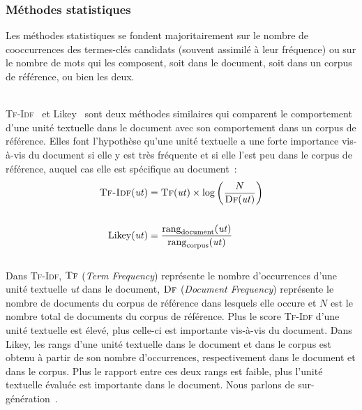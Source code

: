      \subsubsection{Méthodes statistiques}
      \label{subsubsec:main-state_of_the_art-automatic_keyphrase_extraction-unsupervised_keyphrase_extraction-statistical_approaches}
        Les méthodes statistiques se fondent majoritairement sur le nombre de
        cooccurrences des termes-clés candidats (souvent assimilé à leur
        fréquence) ou sur le nombre de mots qui les composent, soit dans le
        document, soit dans un corpus de référence, ou bien les deux.

        ~\\\textsc{Tf-Idf}~\cite{jones1972tfidf} et Likey~\cite{paukkeri2010likey}
        sont deux méthodes similaires qui comparent le comportement d'une unité
        textuelle dans le document avec son comportement dans un corpus de
        référence. Elles font l'hypothèse qu'une unité textuelle a une forte
        importance vis-à-vis du document si elle y est très fréquente et si elle
        l'est peu dans le corpus de référence, auquel cas elle est spécifique au
        document~:
        \begin{align}
          \text{\textsc{Tf-Idf}}(\text{\textit{ut}}) &= \textsc{Tf}(\text{\textit{ut}}) \times \log\left(\frac{N}{\textsc{Df}(\text{\textit{ut}})}\right) \label{math:tfidf}\\
          \notag\\
          \text{Likey}(\text{\textit{ut}}) &= \frac{\text{rang}_{\text{document}}(\text{\textit{ut}})}{\text{rang}_{\text{corpus}}(\text{\textit{ut}})} \label{math:likey}
        \end{align}\\
        Dans \textsc{Tf-Idf}, $\textsc{Tf}$ (\textit{Term Frequency}) représente
        le nombre d'occurrences d'une unité textuelle \textit{ut} dans le
        document, $\textsc{Df}$ (\textit{Document Frequency}) représente le
        nombre de documents du corpus de référence dans lesquels elle occure
        et $N$ est le nombre total de documents du corpus de référence. Plus le
        score \textsc{Tf-Idf} d'une unité textuelle est élevé, plus celle-ci est
        importante vis-à-vis du document. Dans Likey, les rangs d'une unité
        textuelle dans le document et dans le corpus est obtenu à partir de son
        nombre d'occurrences, respectivement dans le document et dans le corpus.
        Plus le rapport entre ces deux rangs est faible, plus l'unité textuelle
        évaluée est importante dans le document. Nous parlons de
        sur-génération~\cite{hasan2014state_of_the_art}.

